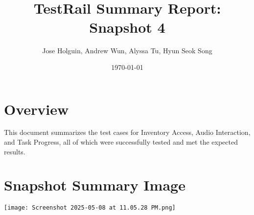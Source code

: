 \documentclass[11pt]{article}
\title{TestRail Summary Report: Snapshot 4}
\author{Jose Holguin, Andrew Wun, Alyssa Tu, Hyun Seok Song}
\date{\today}
\begin{document}
\maketitle

\section{Overview}
This document summarizes the test cases for Inventory Access, Audio Interaction, and Task Progress, all of which were successfully tested and met the expected results.

\section{Snapshot Summary Image}

\texttt{[image: Screenshot 2025-05-08 at 11.05.28 PM.png]}
\end{document}
